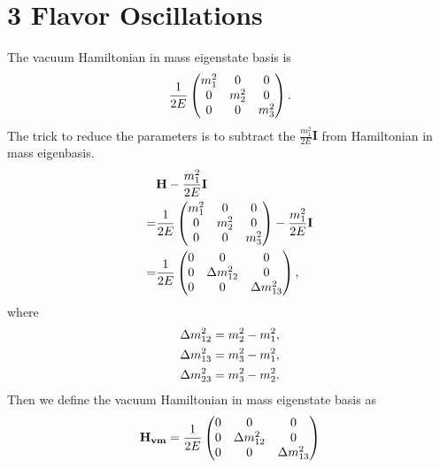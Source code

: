 \documentclass[letterpaper,12pt,english]{sphinxmanual}
\begin{document}
\section{3 Flavor Oscillations}
\label{vacuum:flavor-oscillations}
The vacuum Hamiltonian in mass eigenstate basis is
\begin{gather}
\begin{split}\frac{1}{2E}\begin{pmatrix}
m_1^2 & 0 & 0 \\
0 & m_2^2 &  0\\
0 & 0 & m_3^2
\end{pmatrix}.\end{split}\notag
\end{gather}
The trick to reduce the parameters is to subtract the \(\frac{m_1^2}{2E} \mathbf{I}\) from Hamiltonian in mass eigenbasis.
\begin{gather}
\begin{split}&\mathbf{H}- \frac{m_1^2}{2E}\mathbf{I} \\
=& \frac{1}{2E}\begin{pmatrix}
m_1^2 & 0 & 0 \\
0 & m_2^2 &  0\\
0 & 0 & m_3^2
\end{pmatrix} - \frac{m_1^2}{2E} \mathbf{I} \\
=& \frac{1}{2E} \begin{pmatrix}
0 & 0 & 0 \\
0 & \Delta m_{12}^2 & 0 \\
0 & 0 & \Delta m_{13}^2
\end{pmatrix},\end{split}\notag
\end{gather}
where
\begin{gather}
\begin{split}\Delta m_{12}^2 &= m_2^2 - m_1^2, \\
\Delta m_{13}^2 &= m_3^2 - m_1^2, \\
\Delta m_{23}^2 & = m_3^2 - m_2^2.\end{split}\notag
\end{gather}
Then we define the vacuum Hamiltonian in mass eigenstate basis as
\begin{gather}
\begin{split}\mathbf{H_{vm}} = \frac{1}{2E} \begin{pmatrix}
0 & 0 & 0 \\
0 & \Delta m_{12}^2 & 0 \\
0 & 0 & \Delta m_{13}^2
\end{pmatrix}\end{split}\notag
\end{gather}
\end{document}
